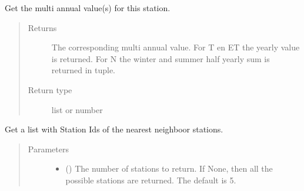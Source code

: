 \documentclass[letterpaper,10pt,english]{sphinxmanual}
\begin{document}
\begin{fulllineitems}
\begin{fulllineitems}
\end{fulllineitems}


\begin{fulllineitems}
\label{\detokenize{weatherDB:weatherDB.station.StationBase.get_multi_annual}}
\sphinxAtStartPar
Get the multi annual value(s) for this station.
\begin{quote}\begin{description}
\item[{Returns}] \leavevmode
\sphinxAtStartPar
The corresponding multi annual value.
For T en ET the yearly value is returned.
For N the winter and summer half yearly sum is returned in tuple.

\item[{Return type}] \leavevmode
\sphinxAtStartPar
list or number

\end{description}\end{quote}

\end{fulllineitems}


\begin{fulllineitems}
\label{\detokenize{weatherDB:weatherDB.station.StationBase.get_name}}
\end{fulllineitems}


\begin{fulllineitems}
\label{\detokenize{weatherDB:weatherDB.station.StationBase.get_neighboor_stids}}
\sphinxAtStartPar
Get a list with Station Ids of the nearest neighboor stations.
\begin{quote}\begin{description}
\item[{Parameters}] \leavevmode\begin{itemize}
\item {} 
\sphinxAtStartPar
{} (\sphinxstyleliteralemphasis{\sphinxupquote{, }}) \textendash{} The number of stations to return.
If None, then all the possible stations are returned.
The default is 5.


\end{itemize}
\end{description}
\end{quote}
\end{fulllineitems}
\end{fulllineitems}
\end{document}
